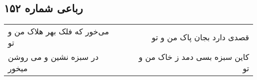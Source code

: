 \begin{center}
\section*{رباعی شماره ۱۵۲}
\label{sec:sh152}
\begin{longtable}{l p{0.5cm} r}
می‌خور که فلک بهر هلاک من و تو
&&
قصدی دارد بجان پاک من و تو
\\
در سبزه نشین و می روشن میخور
&&
کاین سبزه بسی دمد ز خاک من و تو
\\
\end{longtable}
\end{center}
